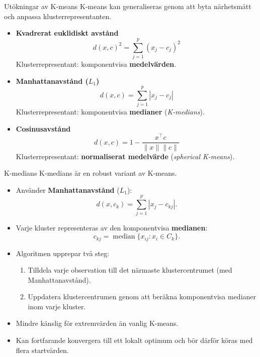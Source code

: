 \documentclass[10pt,english]{beamer}
\begin{document}
\begin{frame}{Utökningar av K-means}
    K-means kan generaliseras genom att byta närhetsmått och anpassa
    klusterrepresentanten.

    \begin{itemize}
        \item \textbf{Kvadrerat euklidiskt avstånd}
        \[
            d(x,c)^2 = \sum_{j=1}^{p}(x_j-c_j)^2
        \]
        Klusterrepresentant: komponentvisa \textbf{medelvärden}.

        \item \textbf{Manhattanavstånd ($L_1$)}
        \[
            d(x,c) = \sum_{j=1}^{p}|x_j-c_j|
        \]
        Klusterrepresentant: komponentvisa \textbf{medianer}
        (\textit{K-medians}).

        \item \textbf{Cosinusavstånd}
        \[
            d(x,c) = 1-\frac{x^\top c}{\lVert x\rVert\lVert c\rVert}
        \]
        Klusterrepresentant: \textbf{normaliserat medelvärde}
        (\textit{spherical K-means}).

    \end{itemize}
\end{frame}


\begin{frame}{K-medians}
    K-medians är en robust variant av K-means.

    \begin{itemize}
        \item Använder \textbf{Manhattanavstånd} ($L_1$):
        \[
            d(x,c_k)=\sum_{j=1}^{p}|x_j-c_{kj}|.
        \]

        \item Varje kluster representeras av den komponentvisa
              \textbf{medianen}:
        \[
            c_{kj}
            =
            \operatorname{median}\{x_{ij}:x_i\in C_k\}.
        \]

        \item Algoritmen upprepar två steg:
        \begin{enumerate}
           \item Tilldela varje observation till det närmaste klustercentrumet
             (med Manhattanavstånd).
            \item Uppdatera klustercentrumen genom att beräkna komponentvisa
              medianer inom varje kluster.
        \end{enumerate}

        \item Mindre känslig för extremvärden än vanlig K-means.

        \item Kan fortfarande konvergera till ett lokalt optimum och bör
              därför köras med flera startvärden.
    \end{itemize}
\end{frame}
\end{document}

